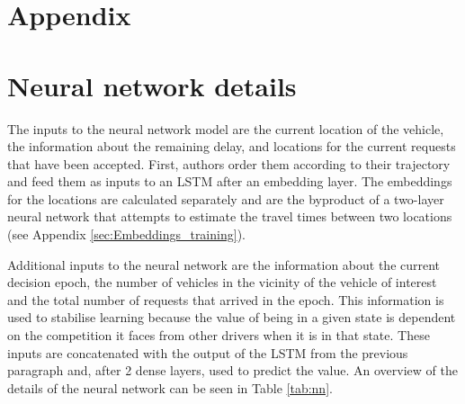 \newpage 

\appendix

\section*{Appendix}

\section{Neural network details} \label{appendix:network}
The inputs to the neural network model are the current location of the vehicle, the information about the remaining delay, and locations for the current requests that have been accepted. First, authors order them according to their trajectory and feed them as inputs to an LSTM \cite{lstm} after an embedding layer. The embeddings for the locations are calculated separately and are the byproduct of a two-layer neural network that attempts to estimate the travel times between two locations (see Appendix \ref{sec:Embeddings_training}).

Additional inputs to the neural network are the information about the current decision epoch, the number of vehicles in the vicinity of the vehicle of interest and the total number of requests that arrived in the epoch. This information is used to stabilise learning because the value of being in a given state is dependent on the competition it faces from other drivers when it is in that state. These inputs are concatenated with the output of the LSTM from the previous paragraph and, after 2 dense layers, used to predict the value. An overview of the details of the neural network can be seen in Table \ref{tab:nn}.

